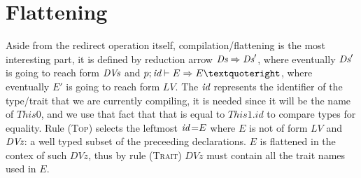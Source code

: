 
\begin{comment}
Define operations on p
--------------------------------------
p.evilPush(L) = (C = L, p)
	for fresh C

p.push(id) = (id = L, p)
    p = (id' = {_;_, id = L, _ ;_}, _; Ds)

(id = L, p).pop() = p
(id = L, p).top() = L

Define equivy ops...
------------------------------
empty =p empty
P, Ps =p P', Ps' iff:
	p.minimize(P) = p.minimize(P')
	Ps =p Ps'

Pz subseteq_p Pz' iff:
	p.minimize(Pz) subseteq p.minimize(Pz')

p.minimize(empty) = empty
p.minimize(P, Pz) = p.minimize(P), p.minimize(Pz)

p.minimize(Thisn+1.idn.Cs) = p.minimize(Thisn.Cs):
  p = id0 = L0, ..., idn = Ln, _; Ds
  p(Thisn.Cs) = L
  // TODO: Check that Ln is an L instead?

otherwise p.minimize(P) = P

define dom(Mz) = Midz
===========================================
dom(empty) = empty
dom(C = E, Mz) = C, dom(Mz)
dom(T m(Txs), Mz) = m, dom(Mz)
\end{comment}

\section{Flattening}

Aside from the redirect operation itself, compilation/flattening is the most interesting part,
it is defined by reduction arrow $\textit{Ds} \Rightarrow \textit{Ds}'$, where eventually $\textit{Ds}'$ is going to reach form $\textit{DVs}$  and $p; \id \vdash E \Rightarrow E’$, where eventually $E'$ is going to reach form $LV$. The $\textit{id}$ represents the identifier of the type/trait that we are currently compiling, it is needed since it will be the name of $This0$, and we use that fact that that is equal to $This1.id$ to compare types for equality.
Rule \textsc{(Top)}  selects the leftmost $\id\eq{E}$
where $E$ is not of form $LV$ and $\textit{DVz}$: a 
well typed subset of the preceeding declarations. 
$E$ is flattened in the contex of such $DVz$, thus
by rule \textsc{(Trait)} $DVz$ must contain all the trait names used in $E$.

